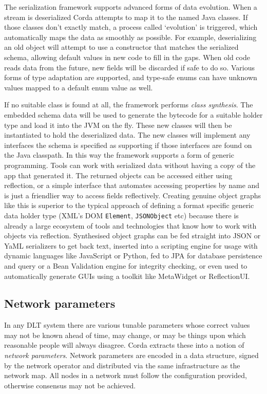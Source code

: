 \documentclass{article}
\begin{document}
The serialization framework supports advanced forms of data evolution. When a stream is deserialized Corda attempts
to map it to the named Java classes. If those classes don't exactly match, a process called `evolution' is
triggered, which automatically maps the data as smoothly as possible. For example, deserializing an old object will
attempt to use a constructor that matches the serialized schema, allowing default values in new code to fill in the
gaps. When old code reads data from the future, new fields will be discarded if safe to do so. Various forms of
type adaptation are supported, and type-safe enums can have unknown values mapped to a default enum value as well.

If no suitable class is found at all, the framework performs \emph{class synthesis}. The embedded schema data will
be used to generate the bytecode for a suitable holder type and load it into the JVM on the fly. These new classes
will then be instantiated to hold the deserialized data. The new classes will implement any interfaces the schema
is specified as supporting if those interfaces are found on the Java classpath. In this way the framework supports
a form of generic programming. Tools can work with serialized data without having a copy of the app that generated
it. The returned objects can be accessed either using reflection, or a simple interface that automates accessing
properties by name and is just a friendlier way to access fields reflectively. Creating genuine object graphs like
this is superior to the typical approach of defining a format specific generic data holder type (XML's DOM
\texttt{Element}, \texttt{JSONObject} etc) because there is already a large ecosystem of tools and technologies
that know how to work with objects via reflection. Synthesised object graphs can be fed straight into JSON or YaML
serializers to get back text, inserted into a scripting engine for usage with dynamic languages like JavaScript or
Python, fed to JPA for database persistence and query or a Bean Validation engine for integrity checking, or even
used to automatically generate GUIs using a toolkit like MetaWidget\cite{MetaWidget} or
ReflectionUI\cite{ReflectionUI}.

\subsection{Network parameters}\label{subsec:network-parameters}

In any DLT system there are various tunable parameters whose correct values may not be known ahead of time, may
change, or may be things upon which reasonable people will always disagree. Corda extracts these into a notion of
\emph{network parameters}. Network parameters are encoded in a data structure, signed by the network operator and
distributed via the same infrastructure as the network map. All nodes in a network must follow the configuration
provided, otherwise consensus may not be achieved.
\end{document}
